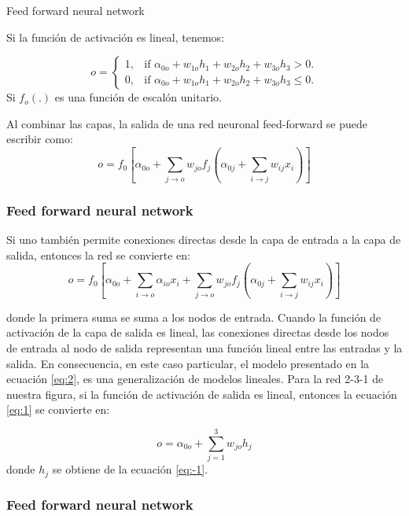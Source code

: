 \documentclass[spanish,xcolor=table]{beamer}
\begin{document}
\begin{section}{Feed forward neural network}
\begin{frame}
Si la funci\'on de activaci\'on es lineal, tenemos:

\begin{equation*}
  o=\begin{cases}
    1, & \text{if $\alpha_{0o}+w_{1o} h_1+w_{2o} h_2+w_{3o} h_3>0$}.\\
    0, & \text{if $\alpha_{0o}+w_{1o} h_1+w_{2o} h_2+w_{3o} h_3 \leq 0$}.
  \end{cases}
\end{equation*}
Si  $f_o (.)$ es una funci\'on de escal\'on unitario.

Al combinar las capas, la salida de una red neuronal feed-forward se puede escribir como:
\begin{equation} \label{eq:1}
o = f_0 \left[ \alpha_{0o} + \sum_{j \to o} w_{jo} f_j \left( \alpha_{0j} + \sum_{i \to j} w_{ij} x_i \right) \right]
\end{equation}

\end{frame}
\begin{frame}
\frametitle{Feed forward neural network}

Si uno tambi\'en permite conexiones directas desde la capa de entrada a la capa de salida, entonces la red se convierte en:
\begin{equation}  \label{eq:2}
o = f_0 \left[ \alpha_{0o} + \sum_{i \to o} \alpha_{io} x_i + \sum_{j \to o} w_{jo} f_j \left( \alpha_{0j} + \sum_{i \to j} w_{ij} x_i \right) \right]
\end{equation}

donde la primera suma se suma a los nodos de entrada. Cuando la funci\'on de activaci\'on de la capa de salida es lineal, las conexiones directas desde los nodos de entrada al nodo de salida representan una funci\'on lineal entre las entradas y la salida. En consecuencia, en este caso particular, el modelo presentado en la ecuaci\'on \ref{eq:2}, es una generalizaci\'on de modelos lineales. Para la red 2-3-1 de nuestra figura, si la funci\'on de activaci\'on de salida es lineal, entonces la ecuaci\'on \ref{eq:1} se convierte en:

\begin{equation*} 
o =  \alpha_{0o} + \sum_{j=1}^ {3} w_{jo} h_j 
\end{equation*}
donde $h_j$ se obtiene de la ecuaci\'on \ref{eq:-1}.
\end{frame}
\begin{frame}
\frametitle{Feed forward neural network}


\end{frame}
\end{section}
\end{document}
